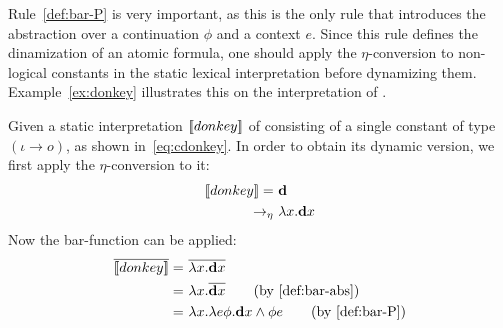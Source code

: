 Rule~\ref{def:bar-P} is very important, as this is the only rule that introduces the abstraction over a continuation $\phi$ and a context $e$. Since this rule defines the dinamization of an atomic formula, one should apply the $\eta$-conversion to non-logical constants in the static lexical interpretation before dynamizing them.
Example~\ref{ex:donkey} illustrates this on the interpretation of .

\begin{example} \label{ex:donkey}
Given a static interpretation $[\![donkey]\!]$ of  consisting of a single constant of type $(\iota \rightarrow o)$, as shown in~\eqref{eq:cdonkey}.
In order to obtain its dynamic version, we first apply the $\eta$-conversion to it: 
\begin{align}
\I{donkey} = \ & \cdonkey \label{eq:cdonkey} \\
\econv \ & \lambda x. \cdonkey x %
\end{align}
Now the bar-function can be applied:
\begin{align}
\tr{\I{donkey}} = \ & \tr{ \lambda x. \cdonkey x } \notag \\
 = \  & \lambda x. \tr{  \cdonkey x } \tag{by~\eqref{def:bar-abs}} \\
  = \  & \lambda x.  \lambda e \phi.  \cdonkey x \land \phi e \tag{by~\eqref{def:bar-P}} 
\end{align}

\end{example}

